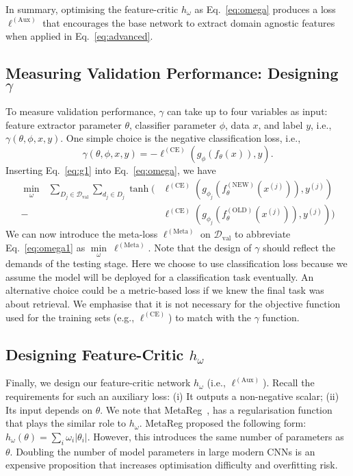 \documentclass{article}
\begin{document}
In summary, optimising the feature-critic $h_\omega$ as Eq.~\ref{eq:omega} produces a loss $\ell^{(\text{Aux})}$ that encourages  the base network to extract domain agnostic features when applied in Eq.~\ref{eq:advanced}.

\subsection{Measuring Validation Performance: Designing $\gamma$}
\label{sec:g}
To measure validation performance, $\gamma$ can take up to four variables as input: feature extractor parameter $\theta$, classifier parameter $\phi$, data $x$, and label $y$, i.e., $\gamma(\theta,\phi,x,y)$. One simple choice is the negative classification loss, i.e.,
\begin{equation}
\label{eq:g1}
\gamma(\theta,\phi,x,y) = -\ell^{(\text{CE})}(g_\phi(f_\theta(x)), y).
\end{equation}
\noindent Inserting Eq.~\ref{eq:g1} into Eq.~\ref{eq:omega}, we have
\begin{equation}
\label{eq:omega1}
\begin{split}
\underset{\omega}{\operatorname{min}}~~~  \sum_{D_j\in \mathcal{D}_\text{val}}\sum_{d_j\in D_j}\tanh(&\ell^{(\text{CE})}(g_{\phi_j}(f_\theta^{(\text{NEW})}(x^{(j)})), y^{(j)})\\ -& \ell^{(\text{CE})}(g_{\phi_j}(f_\theta^{(\text{OLD})}(x^{(j)})), y^{(j)}))    
\end{split}
\end{equation}
We can now introduce the meta-loss $\ell^{(\text{Meta})}$ on $\mathcal{D}_\text{val}$ to abbreviate Eq.~\ref{eq:omega1} as $\underset{\omega}{\operatorname{min}}~ \ell^{(\text{Meta})}$.
Note that the design of $\gamma$ should reflect the demands of the testing stage. Here we choose to use classification loss because we assume the model will be deployed for a classification task eventually. An alternative choice could be a metric-based loss if we knew the final task was about retrieval. We emphasise that it is not necessary for the objective function used for the training sets (e.g., $\ell^{(\text{CE})}$) to match with the $\gamma$ function.

\subsection{Designing Feature-Critic $h_\omega$}
\label{sec:h}
Finally, we design our feature-critic network $h_\omega$ (i.e., $\ell^{(\text{Aux})}$). Recall the requirements for such an auxiliary loss: (i) It outputs a non-negative scalar; (ii) Its input depends on $\theta$. We note that MetaReg~\cite{Balaji18}, has a regularisation function that plays the similar role to $h_\omega$. MetaReg proposed the following form: $h_\omega(\theta) = \sum_{i} \omega_i |\theta_i|$. However, this introduces the same number of parameters as $\theta$. Doubling the number of model parameters in large modern CNNs is an expensive proposition that increases optimisation difficulty and overfitting risk. 
\end{document}
